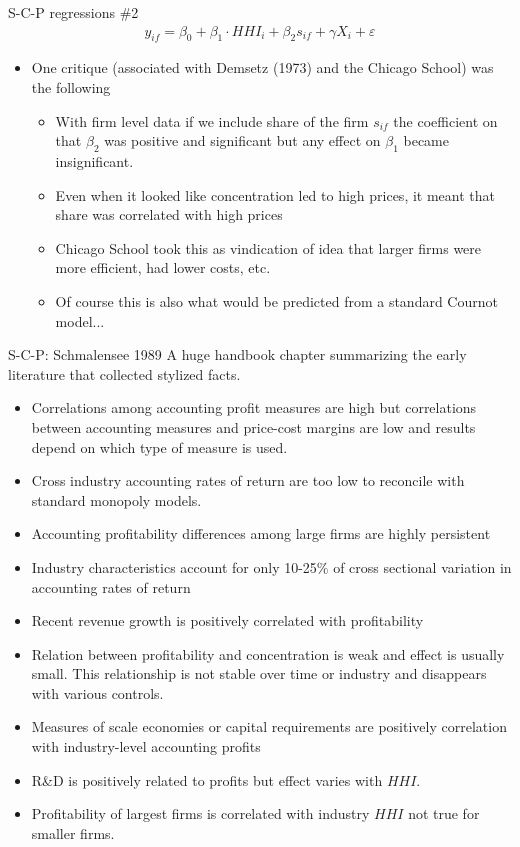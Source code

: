 \documentclass[aspectratio=169,11pt]{beamer}
\begin{document}
\begin{frame}{S-C-P regressions \#2}
\begin{eqnarray*}
y_{if} = \beta_0 + \beta_1 \cdot HHI_i + \beta_2 s_{if} +  \gamma X_{i} +  \varepsilon
\end{eqnarray*}
\begin{itemize}
\item One critique (associated with Demsetz (1973) and the Chicago School) was the following
\begin{itemize}
\item With firm level data if we include share of the firm $s_{if}$ the coefficient on that $\beta_2$ was positive and significant but any effect on $\beta_1$ became insignificant.
\item Even when it looked like concentration led to high prices, it meant that share was correlated with high prices
\item Chicago School took this as vindication of idea that larger firms were more efficient, had lower costs, etc.
\item Of course this is also what would be predicted from a standard Cournot model...
\end{itemize}
\end{itemize}
\end{frame}


\begin{frame}{S-C-P: Schmalensee 1989}
A huge handbook chapter summarizing the early literature that collected stylized facts.
\footnotesize
\begin{itemize}
\item Correlations among accounting profit measures are high but correlations between accounting measures and price-cost margins are low and results depend on which type of measure is used.
\item Cross industry accounting rates of return are too low to reconcile with standard monopoly models.
\item Accounting profitability differences among large firms are highly persistent
\item Industry characteristics account for only 10-25\% of cross sectional variation in accounting rates of return
\item Recent revenue growth is positively correlated with profitability
\item Relation between profitability and concentration is weak and effect is usually small. This relationship is not stable over time or industry and disappears with various controls.
\item Measures of scale economies or capital requirements are positively correlation with industry-level accounting profits
\item R\&D is positively related to profits but effect varies with $HHI$.
\item Profitability of largest firms is correlated with industry $HHI$ not true for smaller firms.
\end{itemize}
\end{frame}
\end{document}
